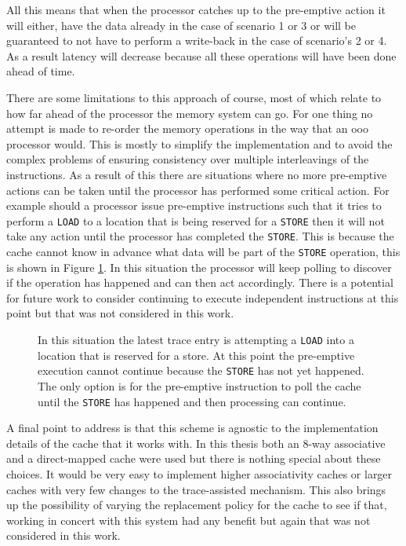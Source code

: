 All this means that when the processor catches up to the pre-emptive action it will either, have the data already in the case of scenario 1 or 3 or will be guaranteed to not have to perform a write-back in the case of scenario's 2 or 4. As a result latency will decrease because all these operations will have been done ahead of time. 

There are some limitations to this approach of course, most of which relate to how far ahead of the processor the memory system can go. For one thing no attempt is made to re-order the memory operations in the way that an \gls{ooo} processor would. This is mostly to simplify the implementation and to avoid the complex problems of ensuring consistency over multiple interleavings of the instructions. As a result of this there are situations where no more pre-emptive actions can be taken until the processor has performed some critical action. For example should a processor issue pre-emptive instructions such that it tries to perform a \texttt{LOAD} to a location that is being reserved for a \texttt{STORE} then it will not take any action until the processor has completed the \texttt{STORE}. This is because the cache cannot know in advance what data will be part of the \texttt{STORE} operation, this is shown in Figure \ref{fig:problem-scenario}. In this situation the processor will keep polling to discover if the operation has happened and can then act accordingly. There is a potential for future work to consider continuing to execute independent instructions at this point but that was not considered in this work. 

\begin{figure} [htbp]
	\begin{center}
		
		\caption[Illustration of a Block on Pre-emptive Actions]{In this situation the latest trace entry is attempting a \texttt{LOAD} into a location that is reserved for a store. At this point the pre-emptive execution cannot continue because the \texttt{STORE} has not yet happened. The only option is for the pre-emptive instruction to poll the cache until the \texttt{STORE} has happened and then processing can continue.}
		\label{fig:problem-scenario}
	\end{center}
\end{figure}

A final point to address is that this scheme is agnostic to the implementation details of the cache that it works with. In this thesis both an 8-way associative and a direct-mapped cache were used but there is nothing special about these choices. It would be very easy to implement higher associativity caches or larger caches with very few changes to the trace-assisted mechanism. This also brings up the possibility of varying the replacement policy for the cache to see if that, working in concert with this system had any benefit but again that was not considered in this work. 

